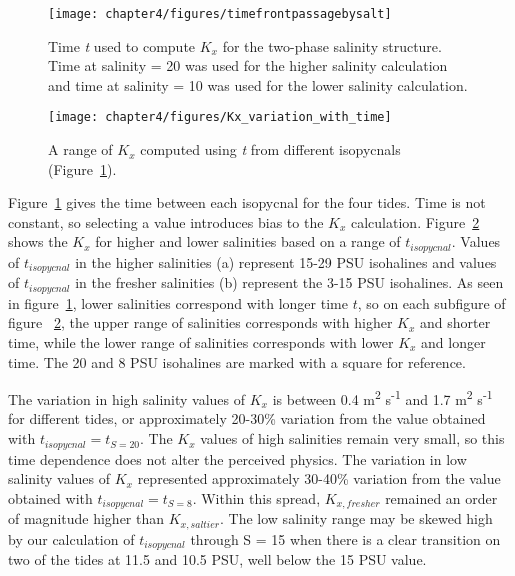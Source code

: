 \begin{figure}
\centering
	\texttt{[image: chapter4/figures/timefrontpassagebysalt]}
	\caption{Time \emph{t} used to compute $K_x$ for the two-phase salinity structure. Time at salinity = 20 was used for the higher salinity calculation and time at salinity = 10 was used for the lower salinity calculation.}  \label{fig:tvsS}
\end{figure}



\begin{figure}
\centering
	\texttt{[image: chapter4/figures/Kx\_variation\_with\_time]}
	\caption{A range of $K_x$ computed using \emph{t} from different isopycnals (Figure~\ref{fig:tvsS}).}  \label{fig:Kxvst}
\end{figure}



Figure~\ref{fig:tvsS} gives the time between each isopycnal for the four tides. Time is not constant, so selecting a value introduces bias to the $K_x$ calculation. Figure~\ref{fig:Kxvst} shows the $K_x$ for higher and lower salinities based on a range of $t_{isopycnal}$. Values of $t_{isopycnal}$ in the higher salinities (a) represent 15-29 PSU isohalines and values of $t_{isopycnal}$ in the fresher salinities (b) represent the 3-15 PSU isohalines. As seen in figure~\ref{fig:tvsS}, lower salinities correspond with longer time $t$, so on each subfigure of figure ~\ref{fig:Kxvst}, the upper range of salinities corresponds with higher $K_x$ and shorter time, while the lower range of salinities corresponds with lower $K_x$ and longer time. The 20 and 8 PSU isohalines are marked with a square for reference.

The variation in high salinity values of $K_x$ is between 0.4 m\textsuperscript{2} s\textsuperscript{-1} and 1.7 m\textsuperscript{2} s\textsuperscript{-1} for different tides, or approximately 20-30\% variation from the value obtained with $t_{isopycnal}=t_{S=20}$. The $K_x$ values of high salinities remain very small, so this time dependence does not alter the perceived physics. The variation in low salinity values of $K_x$ represented approximately 30-40\% variation from the value obtained with $t_{isopycnal}=t_{S=8}$. Within this spread, $K_{x,fresher}$ remained an order of magnitude higher than $K_{x,saltier}$. The low salinity range may be skewed high by our calculation of $t_{isopycnal}$ through S = 15 when there is a clear transition on two of the tides at 11.5 and 10.5 PSU, well below the 15 PSU value. 

